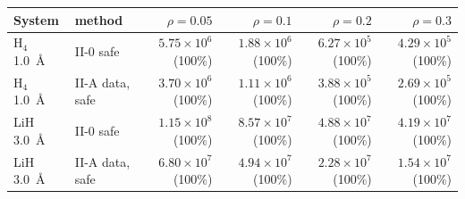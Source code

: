 \begin{tabular}{@{}llrrrr@{}}
\toprule
System & method & $\rho=0.05$ & $\rho=0.1$ & $\rho=0.2$ & $\rho=0.3$ \\
\midrule
H$_4$ 1.0~\AA & II-0 safe & $5.75\times10^{6}$ (100\%) & $1.88\times10^{6}$ (100\%) & $6.27\times10^{5}$ (100\%) & $4.29\times10^{5}$ (100\%) \\
H$_4$ 1.0~\AA & II-A data, safe & $3.70\times10^{6}$ (100\%) & $1.11\times10^{6}$ (100\%) & $3.88\times10^{5}$ (100\%) & $2.69\times10^{5}$ (100\%) \\
LiH 3.0~\AA & II-0 safe & $1.15\times10^{8}$ (100\%) & $8.57\times10^{7}$ (100\%) & $4.88\times10^{7}$ (100\%) & $4.19\times10^{7}$ (100\%) \\
LiH 3.0~\AA & II-A data, safe & $6.80\times10^{7}$ (100\%) & $4.94\times10^{7}$ (100\%) & $2.28\times10^{7}$ (100\%) & $1.54\times10^{7}$ (100\%) \\
\bottomrule
\end{tabular}
